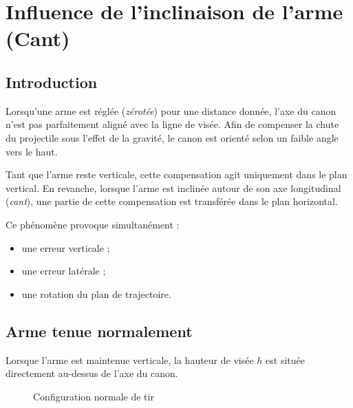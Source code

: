\section{Influence de l'inclinaison de l'arme (Cant)}

\subsection{Introduction}

Lorsqu'une arme est réglée (\textit{zérotée}) pour une distance donnée, l'axe du canon n'est pas parfaitement aligné avec la ligne de visée. Afin de compenser la chute du projectile sous l'effet de la gravité, le canon est orienté selon un faible angle vers le haut.

Tant que l'arme reste verticale, cette compensation agit uniquement dans le plan vertical. En revanche, lorsque l'arme est inclinée autour de son axe longitudinal (\textit{cant}), une partie de cette compensation est transférée dans le plan horizontal.

Ce phénomène provoque simultanément :

\begin{itemize}
\item une erreur verticale ;
\item une erreur latérale ;
\item une rotation du plan de trajectoire.
\end{itemize}

\subsection{Arme tenue normalement}

Lorsque l'arme est maintenue verticale, la hauteur de visée $h$ est située directement au-dessus de l'axe du canon.

\begin{figure}[H]
\centering
{}
\caption{Configuration normale de tir}
\end{figure}

